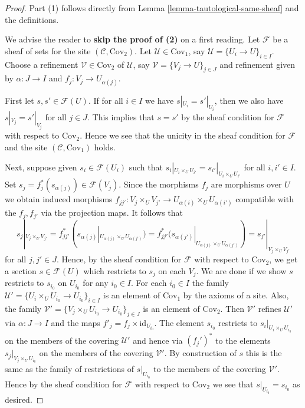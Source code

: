 \begin{proof}
Part (1) follows directly from Lemma \ref{lemma-tautological-same-sheaf}
and the definitions.

\medskip\noindent
We advise the reader to {\bf skip the proof of (2)} on a first reading.
Let $\mathcal{F}$ be a sheaf of sets for the site
$(\mathcal{C}, \text{Cov}_2)$. Let $\mathcal{U} \in \text{Cov}_1$,
say $\mathcal{U} = \{U_i \to U\}_{i\in I}$. Choose a
refinement $\mathcal{V} \in \text{Cov}_2$ of $\mathcal{U}$, say
$\mathcal{V} = \{V_j \to U\}_{j\in J}$ and refinement given
by $\alpha : J \to I$ and $f_j : V_j \to U_{\alpha(j)}$.

\medskip\noindent
First let $s, s' \in \mathcal{F}(U)$. If for all $i \in I$ we
have $s|_{U_i} = s'|_{U_i}$, then we also have $s|_{V_j} = s'|_{V_j}$
for all $j \in J$. This implies that $s = s'$ by the sheaf condition
for $\mathcal{F}$ with respect to $\text{Cov}_2$. Hence we see that
the unicity in the sheaf condition for $\mathcal{F}$ and the
site $(\mathcal{C}, \text{Cov}_1)$ holds.

\medskip\noindent
Next, suppose given
$s_i \in \mathcal{F}(U_i)$ such that $s_i|_{U_i \times_U U_{i'}}
= s_{i'}|_{U_i \times_U U_{i'}}$ for all $i, i' \in I$.
Set $s_j = f_j^*(s_{\alpha(j)}) \in \mathcal{F}(V_j)$.
Since the morphisms $f_j$ are morphisms over $U$ we obtain
induced morphisms $f_{jj'} : V_j \times_U V_{j'} \to
U_{\alpha(i)} \times_U U_{\alpha(i')}$ compatible with the
$f_j, f_{j'}$ via the projection maps. It follows that
$$
s_j|_{V_j \times_U V_{j'}}
= f_{jj'}^*(s_{\alpha(j)}|_{U_{\alpha(j)} \times_U U_{\alpha(j')}})
= f_{jj'}^*(s_{\alpha(j')}|_{U_{\alpha(j)} \times_U U_{\alpha(j')}})
= s_{j'}|_{V_j \times_U V_{j'}}
$$
for all $j, j' \in J$. Hence, by the sheaf condition
for $\mathcal{F}$ with respect to $\text{Cov}_2$, we get a section
$s \in \mathcal{F}(U)$ which restricts to $s_j$ on each $V_j$.
We are done if we show $s$ restricts to $s_{i_0}$ on $U_{i_0}$
for any $i_0 \in I$. For each $i_0 \in I$ the family
$\mathcal{U}' = \{U_i \times_U U_{i_0} \to U_{i_0}\}_{i \in I}$
is an element of $\text{Cov}_1$ by the axioms of a site.
Also, the family
$\mathcal{V}' = \{V_j \times_U U_{i_0} \to U_{i_0}\}_{j \in J}$
is an element of $\text{Cov}_2$.
Then $\mathcal{V}'$ refines $\mathcal{U}'$
via $\alpha : J \to I$ and the maps $f'_j = f_j \times \text{id}_{U_{i_0}}$.
The element $s_{i_0}$ restricts to $s_i|_{U_i \times_U U_{i_0}}$
on the members of the covering $\mathcal{U}'$ and hence via
$(f_j')^*$ to the elements $s_j|_{V_j \times_U U_{i_0}}$ on the members
of the covering $\mathcal{V}'$. By construction of $s$ this is the
same as the family of restrictions of $s|_{U_{i_0}}$ to the members
of the covering $\mathcal{V}'$. Hence by the sheaf condition
for $\mathcal{F}$ with respect to $\text{Cov}_2$ we see that
$s|_{U_{i_0}} = s_{i_0}$ as desired.
\end{proof}

